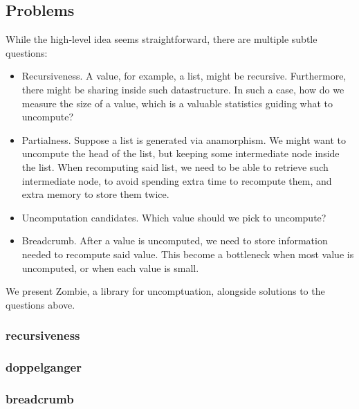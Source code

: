 \subsection{Problems}
While the high-level idea seems straightforward, there are multiple subtle questions: 
\begin{itemize}
	\item Recursiveness. A value, for example, a list, might be recursive. Furthermore, there might be sharing inside such datastructure. In such a case, how do we measure the size of a value, which is a valuable statistics guiding what to uncompute?
	\item Partialness. Suppose a list is generated via anamorphism. We might want to uncompute the head of the list, but keeping some intermediate node inside the list.
	When recomputing said list, we need to be able to retrieve such intermediate node, to
	avoid spending extra time to recompute them, and extra memory to store them twice.
	\item Uncomputation candidates. Which value should we pick to uncompute?
	\item Breadcrumb. After a value is uncomputed, we need to store information needed to recompute said value. This become a bottleneck when most value is uncomputed, or when each value is small.
\end{itemize}

We present Zombie, a library for uncomptuation, alongside solutions to the questions above.
\subsubsection{recursiveness}
\subsubsection{doppelganger}
\subsubsection{breadcrumb}
